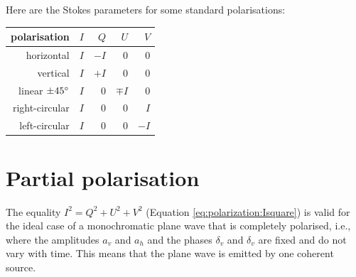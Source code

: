 Here are the Stokes parameters for some standard polarisations:
\begin{center}
\label{stokes-examples}
\begin{tabular}{r@{\hspace{2em}(}r@{,}r@{,}r@{,}r@{)}}
\hline
polarisation & $I$ &   $Q$   &   $U$  &   $V$ \\ \hline
horizontal   & $I$ &  $-I$   &    0   &   0   \\ 
vertical     & $I$ &  $+I$   &    0   &   0   \\ 
linear $\pm 45^\circ$
             & $I$ &   0     &$\mp I$ &   0   \\ 
right-circular& $I$ &  0     &    0   &   $I$ \\ 
left-circular& $I$ &   0     &    0   &  $-I$ \\ \hline
\end{tabular}
\end{center}



\section{Partial polarisation}
\label{sec:polarization:part_pol}
The equality   $I^2 = Q^2 + U^2 + V^2$
(Equation \ref{eq:polarization:Isquare}) 
is valid for the ideal case of a 
monochromatic plane wave that is completely polarised, i.e., where the
amplitudes $a_v$ and
$a_h$ and the phases $\delta_v$ and $\delta_v$ are fixed and do not
vary with time. This means that the plane wave is emitted by one
coherent source.


